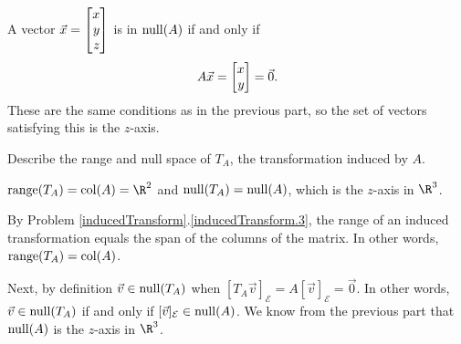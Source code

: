 \documentclass{problemset}
\begin{document}
\begin{parts}
\begin{solution}
				A vector $\vec x=\mat{x\\y\\z}$ is in $\operatorname{null}(A)$ if
				and only if
				\[
					A\vec x = \mat{x\\y} = \vec 0.
				\]
				These are the same conditions as in the previous part, so the set
				of vectors satisfying this is the $z$-axis.
			\end{solution}
		\item Describe the range and null space of $T_A$, the transformation
			induced by $A$.
			\label{fundamentalSubspaces.6}
			\begin{solution}
				$\Range(T_A)=\Col(A)=\R^2$ and $\operatorname{null}(T_A)=\operatorname{null}(A)$,
				which is the $z$-axis in $\R^3$.

				By Problem \ref{inducedTransform}.\ref{inducedTransform.3}, the
				range of an induced transformation equals the span of the columns
				of the matrix. In other words, $\operatorname{range}(T_A)=\operatorname{col}(A)$.

				Next, by definition $\vec v\in\operatorname{null}(T_A)$ when
				$[T_A\vec v]_{\mathcal E}=A[\vec v]_{\mathcal E}=\vec 0$.
				In other words, $\vec v\in\operatorname{null}(T_A)$ if and only if
				$[\vec v]_{\mathcal E}\in\operatorname{null}(A)$. We know from the previous
				part that $\operatorname{null}(A)$ is the $z$-axis in $\R^3$.
			\end{solution}
	\end{parts}
\end{document}
